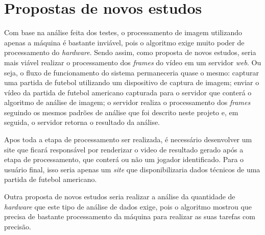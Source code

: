 \section{\textbf{Propostas de novos estudos}}
\label{novos_estudos}

Com base na análise feita dos testes, o processamento de imagem utilizando apenas a máquina é bastante inviável, pois o algoritmo exige muito poder de processamento do \textit{hardware}. Sendo assim, como proposta de novos estudos, seria mais viável realizar o processamento dos \textit{frames} do vídeo em um servidor \textit{web}. Ou seja,  o fluxo de funcionamento do sistema permaneceria quase o mesmo: capturar uma partida de futebol utilizando um dispositivo de captura de imagem; enviar o vídeo da partida de futebol americano capturada para o servidor que conterá o algoritmo de análise de imagem; o servidor realiza o processamento dos \textit{frames} seguindo os mesmos padrões de análise que foi descrito neste projeto e, em seguida, o servidor retorna o resultado da análise.

Apos toda a etapa de processamento ser realizada, é necessário desenvolver um site que ficará responsável por renderizar o video de resultado gerado após a etapa de processamento, que conterá ou não um jogador identificado. Para o usuário final, isso seria apenas um \textit{site} que disponibilizaria dados técnicos de uma partida de futebol americano.

Outra proposta de novos estudos seria realizar a análise da quantidade de \textit{hardware} que este tipo de análise de dados exige, pois o algoritmo mostrou que precisa de bastante processamento da máquina para realizar as suas tarefas com precisão.